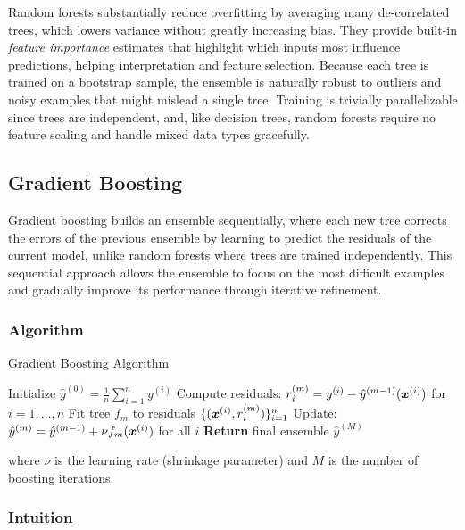 Random forests substantially reduce overfitting by averaging many de-correlated trees, which lowers variance without greatly increasing bias. They provide built-in \emph{feature importance} estimates that highlight which inputs most influence predictions, helping interpretation and feature selection. Because each tree is trained on a bootstrap sample, the ensemble is naturally robust to outliers and noisy examples that might mislead a single tree. Training is trivially parallelizable since trees are independent, and, like decision trees, random forests require no feature scaling and handle mixed data types gracefully.

\subsection{Gradient Boosting}

Gradient boosting builds an ensemble sequentially, where each new tree corrects the errors of the previous ensemble by learning to predict the residuals of the current model, unlike random forests where trees are trained independently. This sequential approach allows the ensemble to focus on the most difficult examples and gradually improve its performance through iterative refinement.

\subsubsection{Algorithm}

\begin{algorithm}[htbp]
\caption{Gradient Boosting Algorithm}
\label{alg:gradient-boosting}
\begin{algorithmic}[1]
\State Initialize $\hat{y}^{(0)} = \frac{1}{n} \sum_{i=1}^{n} y^{(i)}$ 
    \State Compute residuals: $r_i^{(m)} = y^{(i)} - \hat{y}^{(m-1)}(\boldsymbol{x}^{(i)})$ for $i = 1, \ldots, n$
    \State Fit tree $f_m$ to residuals $\{(\boldsymbol{x}^{(i)}, r_i^{(m)})\}_{i=1}^{n}$
    \State Update: $\hat{y}^{(m)} = \hat{y}^{(m-1)} + \nu f_m(\boldsymbol{x}^{(i)})$ for all $i$
\EndFor
\State \textbf{Return} final ensemble $\hat{y}^{(M)}$
\end{algorithmic}
\end{algorithm}

where $\nu$ is the learning rate (shrinkage parameter) and $M$ is the number of boosting iterations.

\subsubsection{Intuition}


